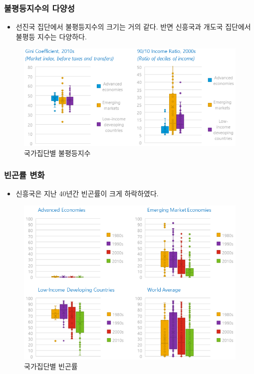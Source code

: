 \documentclass[handout, 10pt]{beamer}
\begin{document}
\begin{frame}[<+->]
\frametitle{불평등지수의 다양성}
    \begin{itemize}
        \item 선진국 집단에서 불평등지수의 크기는 거의 같다. 반면 신흥국과 개도국 집단에서 불평등 지수는 다양하다.
    \end{itemize}
    \begin{figure}[htpb]
        \begin{center}
            \caption{국가집단별 불평등지수}
            \includegraphics[scale=0.35]{pic/Indicators of Inequality across Country Groups.png}
        \end{center}
    \end{figure}
\end{frame}

\begin{frame}[<+->]
\frametitle{빈곤률 변화}
    \begin{itemize}
        \item 신흥국은 지난 40년간 빈곤률이 크게 하락하였다.
    \end{itemize}
    \begin{figure}[htpb]
        \begin{center}
            \caption{국가집단별 빈곤률}
            \includegraphics[scale=0.35]{pic/Poverty across Country Groups.png}
        \end{center}
    \end{figure}
\end{frame}
\end{document}
